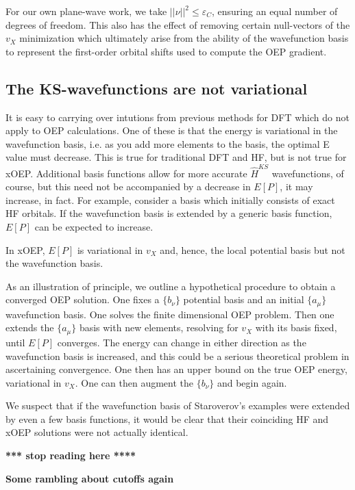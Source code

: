 \documentclass{article}
\newcommand{\norm}[1]{\left|\left|{#1}\right|\right|}
\begin{document}
For our own plane-wave work, we take $\norm{\nu}^2 \le \varepsilon_C$,
ensuring an equal number of degrees of freedom.  This also has the
effect of removing certain null-vectors of the $v_X$ minimization which
ultimately arise from the ability of the wavefunction basis to represent
the first-order orbital shifts used to compute the OEP gradient.

\subsection{The KS-wavefunctions are not variational}

It is easy to carrying over intutions from previous methods for DFT
which do not apply to OEP calculations.  One of these is that the
energy is variational in the wavefunction basis, i.e. as you add more
elements to the basis, the optimal E value must decrease.  This is
true for traditional DFT and HF, but is not true for xOEP.  Additional basis
functions allow for more accurate $\hat{H}^{KS}$ wavefunctions, of
course, but this need not be accompanied by a decrease in $E[P]$, it
may increase, in fact.  For example, consider a basis which initially
consists of exact HF orbitals.  If the wavefunction basis is extended
by a generic basis function, $E[P]$ can be expected to increase.

In xOEP, $E[P]$ is variational in $v_X$ and, hence, the local potential
basis but not the wavefunction basis.

As an illustration of principle, we outline a hypothetical procedure
to obtain a converged OEP solution.  One fixes a $\{b_\nu\}$ potential
basis and an initial $\{a_\mu\}$ wavefunction basis.  One solves the
finite dimensional OEP problem.  Then one extends the $\{a_\mu\}$
basis with new elements, resolving for $v_X$ with its basis fixed,
until $E[P]$ converges.  The energy can change in either direction
as the wavefunction basis is increased, and this could be a serious
theoretical problem in ascertaining convergence.  One then has an
upper bound on the true OEP energy, variational in $v_X$.  One can
then augment the $\{b_\nu\}$ and begin again.

We suspect that if the wavefunction basis of Staroverov's examples
were extended by even a few basis functions, it would be clear that
their coinciding HF and xOEP solutions were not actually identical.


{\bf **** stop reading here ****}


{\bf Some rambling about cutoffs again}
\end{document}
